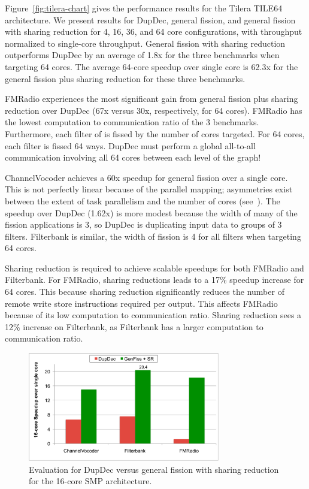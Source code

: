 Figure~\ref{fig:tilera-chart} gives the performance results for the
Tilera TILE64 architecture.  We present results for DupDec, general
fission, and general fission with sharing reduction for 4, 16, 36, and
64 core configurations, with throughput normalized to single-core
throughput.  General fission with sharing reduction outperforms
DupDec by an average of 1.8x for the three benchmarks when targeting
64 cores. The average 64-core speedup over single core is 62.3x for the
general fission plus sharing reduction for these three benchmarks.

FMRadio experiences the most significant gain from general fission
plus sharing reduction over DupDec (67x versus 30x, respectively, for
64 cores).  FMRadio has the lowest computation to communication ratio
of the 3 benchmarks.  Furthermore, each filter of is fissed by the
number of cores targeted.  For 64 cores, each filter is fissed 64
ways.  DupDec must perform a global all-to-all communication involving
all 64 cores between each level of the graph!
 
ChannelVocoder achieves a 60x speedup for general fission over a
single core.  This is not perfectly linear because of the parallel
mapping; asymmetries exist between the extent of task parallelism and
the number of cores (see~\cite{gordon-asplos06}).  The speedup over
DupDec (1.62x) is more modest because the width of many of the
fission applications is 3, so DupDec is duplicating input data to
groups of 3 filters.  Filterbank is similar, the width of fission is 4
for all filters when targeting 64 cores.

Sharing reduction is required to achieve scalable speedups for both
FMRadio and Filterbank.  For FMRadio, sharing reductions leads to a
17\% speedup increase for 64 cores.  This because sharing reduction
significantly reduces the number of remote write store instructions
required per output.  This affects FMRadio because of its low
computation to communication ratio.  Sharing reduction sees a 12\%
increase on Filterbank, as Filterbank has a larger computation to
communication ratio.

\begin{figure}[t]
\centering
\includegraphics[width=3.3in]{figures/smp-chart.pdf}
\caption[Comparing the fission techniques on the 16-core SMP.]{
  Evaluation for DupDec versus general fission with sharing reduction
  for the 16-core SMP architecture.  \label{fig:smp-chart}}
\end{figure}

